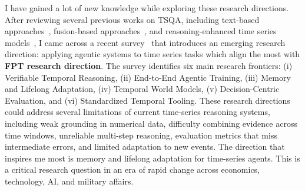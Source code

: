 \documentclass{article}
\begin{document}
I have gained a lot of new knowledge while exploring these research directions. After reviewing several previous works on TSQA, including text-based approaches~\cite{kong2025timemqa}, fusion-based approaches~\cite{lu2026patra}, and reasoning-enhanced time series models~\cite{guan2026timeomni}, I came across a recent survey~\cite{anonymous2026the} that introduces an emerging research direction: applying agentic systems to time series tasks which align the most with \textbf{FPT research direction}. The survey identifies six main research frontiers: (i) Verifiable Temporal Reasoning, (ii) End-to-End Agentic Training, (iii) Memory and Lifelong Adaptation, (iv) Temporal World Models, (v) Decision-Centric Evaluation, and (vi) Standardized Temporal Tooling. These research directions could address several limitations of current time-series reasoning systems, including weak grounding in numerical data, difficulty combining evidence across time windows, unreliable multi-step reasoning, evaluation metrics that miss intermediate errors, and limited adaptation to new events. The direction that inspires me most is memory and lifelong adaptation for time-series agents. This is a critical research question in an era of rapid change across economics, technology, AI, and military affairs.



\end{document}
